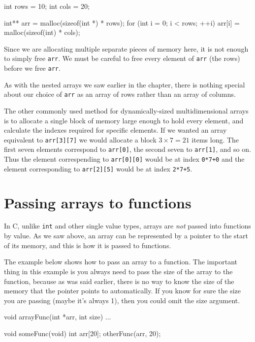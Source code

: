 \begin{codeblock}
int rows = 10;
int cols = 20;

int** arr = malloc(sizeof(int *) * rows);
for (int i = 0; i < rows; ++i) {
    arr[i] = malloc(sizeof(int) * cols);
}
\end{codeblock}

Since we are allocating multiple separate pieces of memory here, it is not enough to simply free \lstinline!arr!.
We must be careful to free every element of \lstinline!arr! (the rows) before we free \lstinline!arr!.

As with the nested arrays we saw earlier in the chapter, there is nothing special about our choice of \lstinline!arr! as an array of rows rather than an array of columns.

The other commonly used method for dynamically-sized multidimensional arrays is to allocate a single block of memory large enough to hold every element, and calculate the indexes required for specific elements.
If we wanted an array equivalent to \lstinline!arr[3][7]! we would allocate a block $3 \times 7 = 21$ items long.
The first seven elements correspond to \lstinline!arr[0]!, the second seven to \lstinline!arr[1]!, and so on.
Thus the element correspending to \lstinline!arr[0][0]! would be at index \lstinline!0*7+0! and the element corresponding to \lstinline!arr[2][5]! would be at index \lstinline!2*7+5!.

\section{Passing arrays to functions}

In C, unlike \texttt{int} and other single value types, arrays are \emph{not} passed into functions by value.
As we saw above, an array can be represented by a pointer to the start of its memory, and this is how it is passed to functions.

The example below shows how to pass an array to a function.
The important thing in this example is you always need to pass the size of the array to the function, because as was said earlier, there is no way to know the size of the memory that the pointer points to automatically.
If you know for sure the size you are passing (maybe it's always 1), then you could omit the size argument.

\begin{codeblock}
void arrayFunc(int *arr, int size) {
    ...
}


void someFunc(void) {
    int arr[20];
    otherFunc(arr, 20);
}
\end{codeblock}

